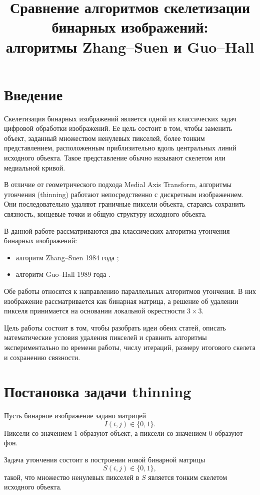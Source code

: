 \documentclass[12pt,a4paper]{article}
\title{
Сравнение алгоритмов скелетизации бинарных изображений:\\
алгоритмы Zhang--Suen и Guo--Hall
}
\author{}
\date{}
\begin{document}
\maketitle

\section{Введение}

Скелетизация бинарных изображений является одной из классических задач цифровой обработки изображений. Ее цель состоит в том, чтобы заменить объект, заданный множеством ненулевых пикселей, более тонким представлением, расположенным приблизительно вдоль центральных линий исходного объекта. Такое представление обычно называют скелетом или медиальной кривой.

В отличие от геометрического подхода Medial Axis Transform, алгоритмы утончения (thinning) работают непосредственно с дискретным изображением. Они последовательно удаляют граничные пиксели объекта, стараясь сохранить связность, концевые точки и общую структуру исходного объекта.

В данной работе рассматриваются два классических алгоритма утончения бинарных изображений:

\begin{itemize}
    \item алгоритм Zhang--Suen 1984 года \cite{zhang1984};
    \item алгоритм Guo--Hall 1989 года \cite{guo1989}.
\end{itemize}

Обе работы относятся к направлению параллельных алгоритмов утончения. В них изображение рассматривается как бинарная матрица, а решение об удалении пикселя принимается на основании локальной окрестности $3\times3$.

Цель работы состоит в том, чтобы разобрать идеи обеих статей, описать математические условия удаления пикселей и сравнить алгоритмы экспериментально по времени работы, числу итераций, размеру итогового скелета и сохранению связности.

\section{Постановка задачи thinning}

Пусть бинарное изображение задано матрицей
\[
    I(i,j) \in \{0,1\}.
\]
Пиксели со значением $1$ образуют объект, а пиксели со значением $0$ образуют фон.

Задача утончения состоит в построении новой бинарной матрицы
\[
    S(i,j) \in \{0,1\},
\]
такой, что множество ненулевых пикселей в $S$ является тонким скелетом исходного объекта.
\end{document}
